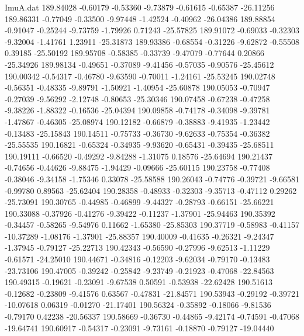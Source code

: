 \begin{filecontents}{ImuA.dat}
 189.84028   -0.60179   -0.53360   -9.73879   -0.61615   -0.65387  -26.11256
 189.86331   -0.77049   -0.33500   -9.97448   -1.42524   -0.40962  -26.04386
 189.88854   -0.91047   -0.25244   -9.73759   -1.79926    0.71243  -25.57825
 189.91072   -0.69033   -0.32303   -9.32004   -1.41761    1.23911  -25.31873
 189.93386   -0.68554   -0.31226   -9.62872   -0.55508    0.39185  -25.50192
 189.95708   -0.58385   -0.33739   -9.47079   -0.77644    0.20866  -25.34926
 189.98134   -0.49651   -0.37089   -9.41456   -0.57035   -0.90576  -25.45612
 190.00342   -0.54317   -0.46780   -9.63590   -0.70011   -1.24161  -25.53245
 190.02748   -0.56351   -0.48335   -9.89791   -1.50921   -1.40954  -25.60878
 190.05053   -0.70947   -0.27039   -9.56292   -2.12748   -0.80653  -25.30346
 190.07458   -0.67238   -0.47258   -9.38226   -1.88322   -0.16536  -25.04394
 190.09858   -0.74178   -0.34098   -9.39781   -1.47867   -0.46305  -25.08974
 190.12182   -0.66879   -0.38883   -9.41935   -1.23442   -0.13483  -25.15843
 190.14511   -0.75733   -0.36730   -9.62633   -0.75354   -0.36382  -25.55535
 190.16821   -0.65324   -0.34935   -9.93620   -0.65431   -0.39435  -25.68511
 190.19111   -0.66520   -0.49292   -9.84288   -1.31075    0.18576  -25.64694
 190.21437   -0.74656   -0.44626   -9.88475   -1.94429   -0.09666  -25.60115
 190.23758   -0.77408   -0.38046   -9.34158   -1.75346    0.33078  -25.58588
 190.26043   -0.74776   -0.39721   -9.66581   -0.99780    0.89563  -25.62404
 190.28358   -0.48933   -0.32303   -9.35713   -0.47112    0.29262  -25.73091
 190.30765   -0.44985   -0.46899   -9.44327   -0.28793   -0.66151  -25.66221
 190.33088   -0.37926   -0.41276   -9.39422   -0.11237   -1.37901  -25.94463
 190.35392   -0.34457   -0.58265   -9.54976    0.11662   -1.65380  -25.85303
 190.37719   -0.58983   -0.41157  -10.37289   -1.08176   -1.37901  -25.88357
 190.40009   -0.41635   -0.26321   -9.24347   -1.37945   -0.79127  -25.22713
 190.42343   -0.56590   -0.27996   -9.62513   -1.11229   -0.61571  -24.25010
 190.44671   -0.34816   -0.12203   -9.62034   -0.79170   -0.13483  -23.73106
 190.47005   -0.39242   -0.25842   -9.23749   -0.21923   -0.47068  -22.84563
 190.49315   -0.19621   -0.23091   -9.67538    0.50591   -0.53938  -22.62428
 190.51613   -0.12682   -0.23809   -9.41576    0.63567   -0.47831  -21.84571
 190.53943   -0.29192   -0.39721  -10.07618    0.06319   -0.01270  -21.17401
 190.56324   -0.35892   -0.18066   -9.81536   -0.79170    0.42238  -20.56337
 190.58669   -0.36730   -0.44865   -9.42174   -0.74591   -0.47068  -19.64741
 190.60917   -0.54317   -0.23091   -9.73161   -0.18870   -0.79127  -19.04440

\end{filecontents}
